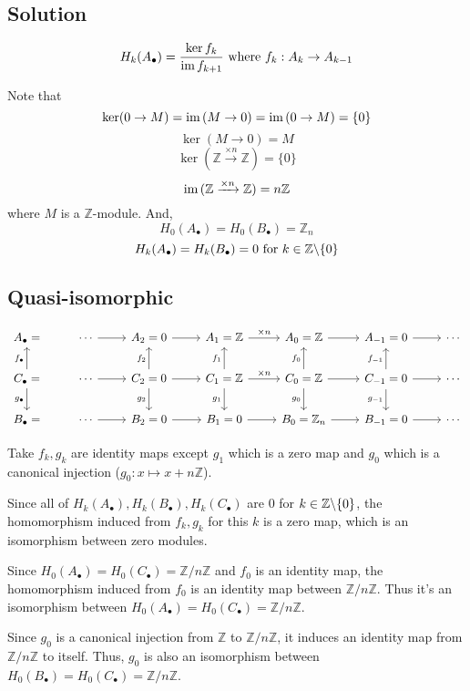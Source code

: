 \documentclass{article}
\newcommand{\bs}{\char`\\}
\newcommand{\bbZ}{\mathbb{Z}}
\newcommand{\im}{\textnormal{im}\,}
\begin{document}
\subsection*{Solution}

\[H_k(A_\bullet) = \frac{\ker f_k}{\im f_{k + 1}} \text{ where } f_k: A_k \to A_{k - 1}\]

Note that
\[\ker (0 \rightarrow M) = \im (M \rightarrow 0) =
  \im (0 \rightarrow M) = 
  \{0\}\]
\[\ker (M \rightarrow 0) = M\]
\[\ker (\bbZ \xrightarrow{\times n} \bbZ) = \{0\}\]
\[\im (\bbZ \xrightarrow{\times n} \bbZ) = n\bbZ\]
where \(M\) is a \(\bbZ\)-module. And,
\[H_0(A_\bullet) = H_0(B_\bullet) = \bbZ_n\]
\[H_k(A_\bullet) = H_k(B_\bullet) = 0 \text{ for } k \in \bbZ\bs\{0\}\]

\subsection*{Quasi-isomorphic}

\[\begin{tikzcd}
  A_\bullet = & \cdots \ar{r} & A_2 = 0 \ar{r} & A_1 = \bbZ \ar["\times n"]{r} & A_0 = \bbZ \ar{r} & A_{-1} = 0 \ar{r} & \cdots \\
  C_\bullet \ar["f_\bullet"]{u} \ar[swap, "g_\bullet"]{d} = & \cdots \ar{r} & C_2 = 0 \ar{r} \ar["f_2"]{u} \ar[swap, "g_2"]{d} & C_1 = \bbZ \ar["f_1"]{u} \ar[swap, "g_1"]{d} \ar["\times n"]{r} & C_0 = \bbZ \ar["f_0"]{u} \ar[swap, "g_0"]{d} \ar{r} & C_{-1} = 0 \ar["f_{-1}"]{u} \ar[swap, "g_{-1}"]{d} \ar{r} & \cdots \\
  B_\bullet = & \cdots \ar{r} & B_2 = 0 \ar{r} & B_1 = 0 \ar{r} & B_0 = \bbZ_n \ar{r} & B_{-1} = 0 \ar{r} & \cdots
\end{tikzcd}\]

Take \(f_k, g_k\) are identity maps except \(g_1\) which is a zero map and \(g_0\) which is a canonical injection (\(g_0: x \mapsto x + n\bbZ\)).

Since all of \(H_k(A_\bullet), H_k(B_\bullet), H_k(C_\bullet)\) are \(0\) for \(k \in \bbZ \bs \{0\}\), the homomorphism induced from \(f_k, g_k\) for this \(k\) is a zero map, which is an isomorphism between zero modules.

Since \(H_0(A_\bullet) = H_0(C_\bullet) = \bbZ / n\bbZ\) and \(f_0\) is an identity map, the homomorphism induced from \(f_0\) is an identity map between \(\bbZ / n\bbZ\). Thus it's an isomorphism between \(H_0(A_\bullet) = H_0(C_\bullet) = \bbZ / n\bbZ\).

Since \(g_0\) is a canonical injection from \(\bbZ\) to \(\bbZ / n\bbZ\), it induces an identity map from \(\bbZ / n\bbZ\) to itself.
Thus, \(g_0\) is also an isomorphism between \(H_0(B_\bullet) = H_0(C_\bullet) = \bbZ / n\bbZ\).
\end{document}
